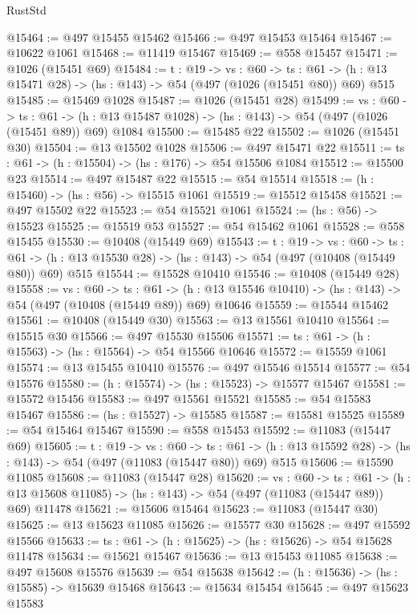 \begin{lexlean}{RustStd}
\begin{coremodule}
@15464 := @497 @15455 @15462
@15466 := @497 @15453 @15464
@15467 := @10622 @1061
@15468 := @11419 @15467
@15469 := @558 @15457
@15471 := @1026 (@15451 @69)
@15484 := {t : @19} ->
  {vs : @60} ->
  {ts : @61} -> (h : @13 @15471 @28) -> (hs : @143) -> @54 (@497 (@1026 (@15451 @80)) @69) @515
@15485 := @15469 @1028
@15487 := @1026 (@15451 @28)
@15499 := {vs : @60} ->
  {ts : @61} -> (h : @13 @15487 @1028) -> (hs : @143) -> @54 (@497 (@1026 (@15451 @89)) @69) @1084
@15500 := @15485 @22
@15502 := @1026 (@15451 @30)
@15504 := @13 @15502 @1028
@15506 := @497 @15471 @22
@15511 := {ts : @61} -> (h : @15504) -> (hs : @176) -> @54 @15506 @1084
@15512 := @15500 @23
@15514 := @497 @15487 @22
@15515 := @54 @15514
@15518 := (h : @15460) -> (hs : @56) -> @15515 @1061
@15519 := @15512 @15458
@15521 := @497 @15502 @22
@15523 := @54 @15521 @1061
@15524 := (hs : @56) -> @15523
@15525 := @15519 @53
@15527 := @54 @15462 @1061
@15528 := @558 @15455
@15530 := @10408 (@15449 @69)
@15543 := {t : @19} ->
  {vs : @60} ->
  {ts : @61} -> (h : @13 @15530 @28) -> (hs : @143) -> @54 (@497 (@10408 (@15449 @80)) @69) @515
@15544 := @15528 @10410
@15546 := @10408 (@15449 @28)
@15558 := {vs : @60} ->
  {ts : @61} ->
  (h : @13 @15546 @10410) -> (hs : @143) -> @54 (@497 (@10408 (@15449 @89)) @69) @10646
@15559 := @15544 @15462
@15561 := @10408 (@15449 @30)
@15563 := @13 @15561 @10410
@15564 := @15515 @30
@15566 := @497 @15530 @15506
@15571 := {ts : @61} -> (h : @15563) -> (hs : @15564) -> @54 @15566 @10646
@15572 := @15559 @1061
@15574 := @13 @15455 @10410
@15576 := @497 @15546 @15514
@15577 := @54 @15576
@15580 := (h : @15574) -> (hs : @15523) -> @15577 @15467
@15581 := @15572 @15456
@15583 := @497 @15561 @15521
@15585 := @54 @15583 @15467
@15586 := (hs : @15527) -> @15585
@15587 := @15581 @15525
@15589 := @54 @15464 @15467
@15590 := @558 @15453
@15592 := @11083 (@15447 @69)
@15605 := {t : @19} ->
  {vs : @60} ->
  {ts : @61} -> (h : @13 @15592 @28) -> (hs : @143) -> @54 (@497 (@11083 (@15447 @80)) @69) @515
@15606 := @15590 @11085
@15608 := @11083 (@15447 @28)
@15620 := {vs : @60} ->
  {ts : @61} ->
  (h : @13 @15608 @11085) -> (hs : @143) -> @54 (@497 (@11083 (@15447 @89)) @69) @11478
@15621 := @15606 @15464
@15623 := @11083 (@15447 @30)
@15625 := @13 @15623 @11085
@15626 := @15577 @30
@15628 := @497 @15592 @15566
@15633 := {ts : @61} -> (h : @15625) -> (hs : @15626) -> @54 @15628 @11478
@15634 := @15621 @15467
@15636 := @13 @15453 @11085
@15638 := @497 @15608 @15576
@15639 := @54 @15638
@15642 := (h : @15636) -> (hs : @15585) -> @15639 @15468
@15643 := @15634 @15454
@15645 := @497 @15623 @15583

\end{coremodule}
\end{lexlean}
